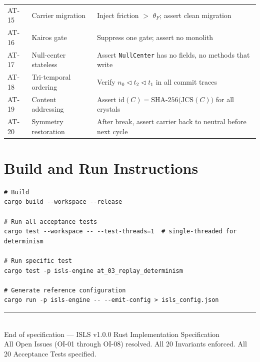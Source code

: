 \documentclass[10pt,a4paper]{article}
\theoremstyle{definition}\newtheorem{definition}{Def}[section]
\theoremstyle{plain}\newtheorem{theorem}{Thm}[section]
\newcommand{\ty}[1]{\texttt{\small\color{accent}#1}}
\begin{document}
\begin{longtable}{l l p{7.5cm}}
AT-15 & Carrier migration & Inject friction $>$ $\theta_F$; assert clean migration \\
AT-16 & Kairos gate & Suppress one gate; assert no monolith \\
AT-17 & Null-center stateless & Assert \ty{NullCenter} has no fields, no methods that write \\
AT-18 & Tri-temporal ordering & Verify $n_0 \triangleleft t_2 \triangleleft t_1$ in all commit traces \\
AT-19 & Content addressing & Assert $\text{id}(C) = \text{SHA-256(JCS}(C))$ for all crystals \\
AT-20 & Symmetry restoration & After break, assert carrier back to neutral before next cycle \\
\bottomrule
\end{longtable}

\section{Build and Run Instructions}
\label{sec:build}

\begin{lstlisting}[style=yaml]
# Build
cargo build --workspace --release

# Run all acceptance tests
cargo test --workspace -- --test-threads=1  # single-threaded for determinism

# Run specific test
cargo test -p isls-engine at_03_replay_determinism

# Generate reference configuration
cargo run -p isls-engine -- --emit-config > isls_config.json
\end{lstlisting}

\vspace{0.5cm}
\begin{center}
\rule{0.6\textwidth}{0.3pt}\\[0.3cm]
{\small End of specification — ISLS v1.0.0 Rust Implementation Specification}\\
{\scriptsize All Open Issues (OI-01 through OI-08) resolved. All 20 Invariants enforced. All 20 Acceptance Tests specified.}
\end{center}
\end{document}
